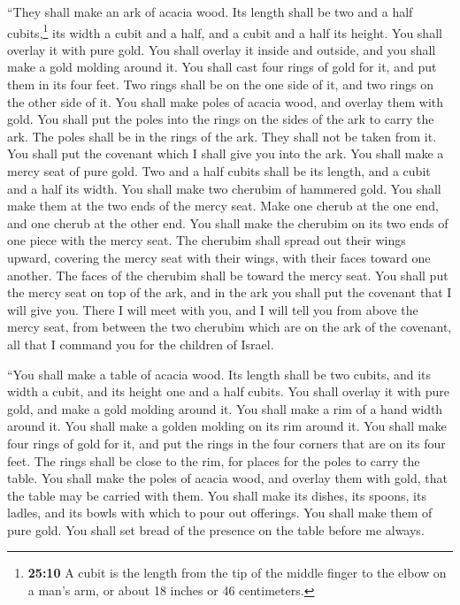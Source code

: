  ``They shall make an ark of acacia wood. Its length
shall be two and a half cubits,\footnote{\textbf{25:10} A cubit is the
  length from the tip of the middle finger to the elbow on a man's arm,
  or about 18 inches or 46 centimeters.} its width a cubit and a half,
and a cubit and a half its height.  You shall overlay it
with pure gold. You shall overlay it inside and outside, and you shall
make a gold molding around it.  You shall cast four rings
of gold for it, and put them in its four feet. Two rings shall be on the
one side of it, and two rings on the other side of it. 
You shall make poles of acacia wood, and overlay them with gold.
 You shall put the poles into the rings on the sides of
the ark to carry the ark.  The poles shall be in the
rings of the ark. They shall not be taken from it.  You
shall put the covenant which I shall give you into the ark.
 You shall make a mercy seat of pure gold. Two and a half
cubits shall be its length, and a cubit and a half its width.
 You shall make two cherubim of hammered gold. You shall
make them at the two ends of the mercy seat.  Make one
cherub at the one end, and one cherub at the other end. You shall make
the cherubim on its two ends of one piece with the mercy seat.
 The cherubim shall spread out their wings upward,
covering the mercy seat with their wings, with their faces toward one
another. The faces of the cherubim shall be toward the mercy seat.
 You shall put the mercy seat on top of the ark, and in
the ark you shall put the covenant that I will give you. 
There I will meet with you, and I will tell you from above the mercy
seat, from between the two cherubim which are on the ark of the
covenant, all that I command you for the children of Israel.

 ``You shall make a table of acacia wood. Its length
shall be two cubits, and its width a cubit, and its height one and a
half cubits.  You shall overlay it with pure gold, and
make a gold molding around it.  You shall make a rim of a
hand width around it. You shall make a golden molding on its rim around
it.  You shall make four rings of gold for it, and put
the rings in the four corners that are on its four feet. 
The rings shall be close to the rim, for places for the poles to carry
the table.  You shall make the poles of acacia wood, and
overlay them with gold, that the table may be carried with them.
 You shall make its dishes, its spoons, its ladles, and
its bowls with which to pour out offerings. You shall make them of pure
gold.  You shall set bread of the presence on the table
before me always.

